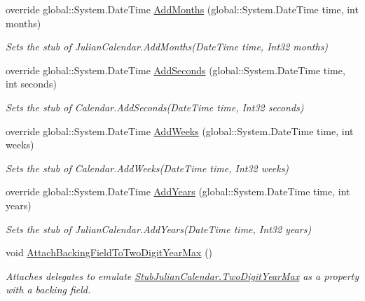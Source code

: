 \begin{DoxyCompactItemize}
override global\-::\-System.\-Date\-Time \hyperlink{class_system_1_1_globalization_1_1_fakes_1_1_stub_julian_calendar_a40588313880ce319f09c9fbf87cbc972}{Add\-Months} (global\-::\-System.\-Date\-Time time, int months)
\begin{DoxyCompactList}\small\item\em Sets the stub of Julian\-Calendar.\-Add\-Months(\-Date\-Time time, Int32 months)\end{DoxyCompactList}\item 
override global\-::\-System.\-Date\-Time \hyperlink{class_system_1_1_globalization_1_1_fakes_1_1_stub_julian_calendar_ae900861236d1c905996dc078cd553027}{Add\-Seconds} (global\-::\-System.\-Date\-Time time, int seconds)
\begin{DoxyCompactList}\small\item\em Sets the stub of Calendar.\-Add\-Seconds(\-Date\-Time time, Int32 seconds)\end{DoxyCompactList}\item 
override global\-::\-System.\-Date\-Time \hyperlink{class_system_1_1_globalization_1_1_fakes_1_1_stub_julian_calendar_afe8ad3bf3e7545ebe95d15d2dcec110e}{Add\-Weeks} (global\-::\-System.\-Date\-Time time, int weeks)
\begin{DoxyCompactList}\small\item\em Sets the stub of Calendar.\-Add\-Weeks(\-Date\-Time time, Int32 weeks)\end{DoxyCompactList}\item 
override global\-::\-System.\-Date\-Time \hyperlink{class_system_1_1_globalization_1_1_fakes_1_1_stub_julian_calendar_a7854c83bde44897fb3c56111d43131d5}{Add\-Years} (global\-::\-System.\-Date\-Time time, int years)
\begin{DoxyCompactList}\small\item\em Sets the stub of Julian\-Calendar.\-Add\-Years(\-Date\-Time time, Int32 years)\end{DoxyCompactList}\item 
void \hyperlink{class_system_1_1_globalization_1_1_fakes_1_1_stub_julian_calendar_af09dbee7c82c6f887b965c2301947870}{Attach\-Backing\-Field\-To\-Two\-Digit\-Year\-Max} ()
\begin{DoxyCompactList}\small\item\em Attaches delegates to emulate \hyperlink{class_system_1_1_globalization_1_1_fakes_1_1_stub_julian_calendar_abbbf0aaee51fdf8528c0ef17313ba54c}{Stub\-Julian\-Calendar.\-Two\-Digit\-Year\-Max} as a property with a backing field.\end{DoxyCompactList}\item 

\end{DoxyCompactItemize}

